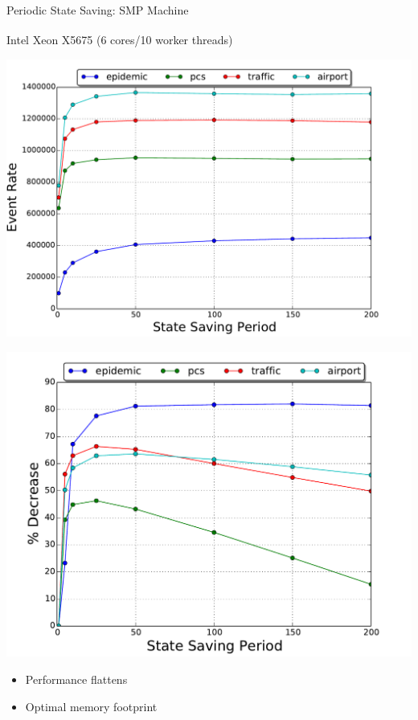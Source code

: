 \documentclass[10pt]{beamer}
\begin{document}
\begin{frame}{Periodic State Saving: SMP Machine}
    \begin{block}{Intel\textsuperscript{\textregistered} Xeon\textsuperscript{\textregistered} X5675 (6 cores/10 worker threads)}
        \bigskip
        \begin{minipage}{0.55\textwidth}
            \includegraphics[width=\textwidth]{../figs/state_saving/bc/eventrate.pdf}
        \end{minipage}%
        \begin{minipage}{0.55\textwidth}
            \includegraphics[width=\textwidth]{../figs/state_saving/bc/percent_memory_decrease.pdf}
        \end{minipage}
        \begin{itemize}
            \item Performance flattens
            \item Optimal memory footprint
        \end{itemize}
    \end{block}
\end{frame}
\end{document}
